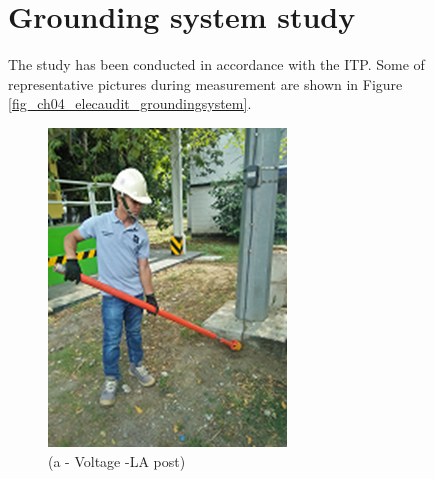 \section{Grounding system study} \label{ch04_elecaudit_groundingsystem}
The study has been conducted in accordance with the ITP. Some of representative pictures during measurement are shown in Figure \ref{fig_ch04_elecaudit_groundingsystem}.

\begin{figure}[!h]
	
	\begin{minipage}[b]{0.3\linewidth}
		\centering
		\includegraphics[width=\textwidth]{figures/fig_ch04_elecaudit_grounding_voltage_lapost}
		\caption*{(a - Voltage -LA post)}
	\end{minipage}
	\hspace{0.03cm}
	\begin{minipage}[b]{0.3\linewidth}
	\centering

\end{minipage}
\end{figure}

